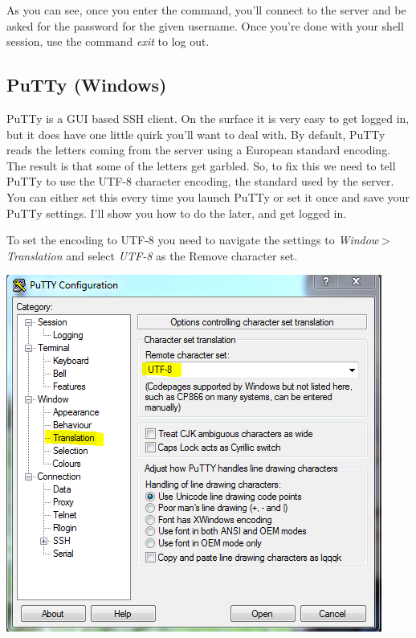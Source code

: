 \documentclass[nobib]{tufte-handout}
\begin{document}
As you can see, once you enter the command, you'll connect to the server and be asked for the password for the given username. Once you're done with your shell session, use the command \textit{exit} to log out.

\subsection{PuTTy (Windows)}

PuTTy is a GUI based SSH client.  On the surface it is very easy to get logged in, but it does have one little quirk you'll want to deal with. By default, PuTTy reads the letters coming from the server using a European standard encoding.  The result is that some of the letters get garbled. So, to fix this we need to tell PuTTy to use the UTF-8 character encoding, the standard used by the server.  You can either set this every time you launch PuTTy or set it once and save your PuTTy settings. I'll show you how to do the later, and get logged in.

To set the encoding to UTF-8 you need to navigate the settings to \textit{Window$>$Translation} and select \textit{UTF-8} as the Remove character set.

\vspace{.1in}
\begin{center}
\includegraphics[scale=.75]{Putty-SetUTF8.png}
\end{center}
\vspace{.1in}
\end{document}
